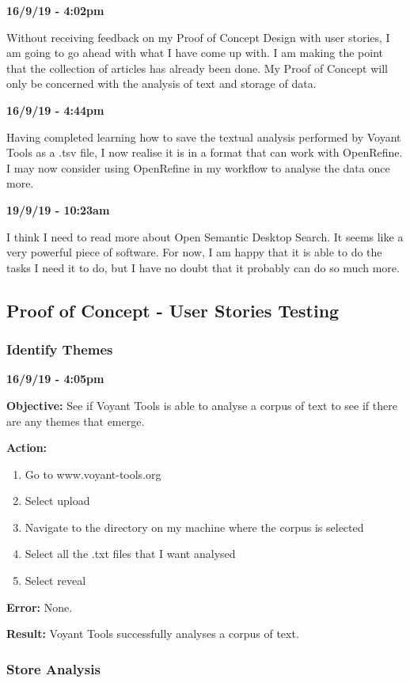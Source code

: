\documentclass{article}
\begin{document}
\textbf{16/9/19 - 4:02pm}

Without receiving feedback on my Proof of Concept Design with user stories, I am going to go ahead with what I have come up with. I am making the point that the collection of articles has already been done. My Proof of Concept will only be concerned with the analysis of text and storage of data.

\textbf{16/9/19 - 4:44pm}

Having completed learning how to save the textual analysis performed by Voyant Tools as a .tsv file, I now realise it is in a format that can work with OpenRefine. I may now consider using OpenRefine in my workflow to analyse the data once more.

\textbf{19/9/19 - 10:23am}

I think I need to read more about Open Semantic Desktop Search. It seems like a very powerful piece of software. For now, I am happy that it is able to do the tasks I need it to do, but I have no doubt that it probably can do so much more.

\newpage
\subsection{Proof of Concept - User Stories Testing}

\subsubsection{Identify Themes}

\textbf{16/9/19 - 4:05pm}

\textbf{Objective:} See if Voyant Tools is able to analyse a corpus of text to see if there are any themes that emerge.

\textbf{Action:}
\begin{enumerate}
    \item Go to www.voyant-tools.org
    \item Select upload
    \item Navigate to the directory on my machine where the corpus is selected
    \item Select all the .txt files that I want analysed
    \item Select reveal
\end{enumerate}

\textbf{Error:} None.

\textbf{Result:} Voyant Tools successfully analyses a corpus of text.

\subsubsection{Store Analysis}
\end{document}
